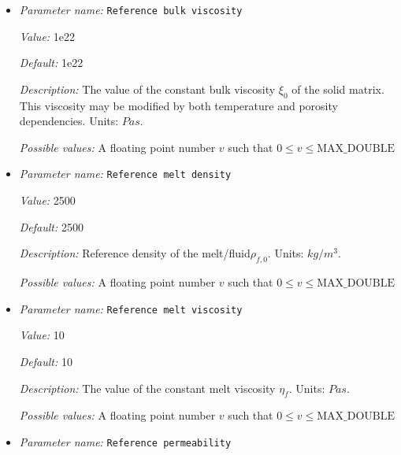 \begin{itemize}
{\it Default:} -300


{\it Description:} The entropy change for the phase transition from solid to melt of peridotite. Units: $J/(kg K)$.


{\it Possible values:} A floating point number $v$ such that $-\text{MAX\_DOUBLE} \leq v \leq \text{MAX\_DOUBLE}$
\item {\it Parameter name:} {\tt Reference bulk viscosity}
\label{parameters:Material model/Melt simple/Reference bulk viscosity}


{\it Value:} 1e22


{\it Default:} 1e22


{\it Description:} The value of the constant bulk viscosity $\xi_0$ of the solid matrix. This viscosity may be modified by both temperature and porosity dependencies. Units: $Pa s$.


{\it Possible values:} A floating point number $v$ such that $0 \leq v \leq \text{MAX\_DOUBLE}$
\item {\it Parameter name:} {\tt Reference melt density}
\label{parameters:Material model/Melt simple/Reference melt density}


{\it Value:} 2500


{\it Default:} 2500


{\it Description:} Reference density of the melt/fluid$\rho_{f,0}$. Units: $kg/m^3$.


{\it Possible values:} A floating point number $v$ such that $0 \leq v \leq \text{MAX\_DOUBLE}$
\item {\it Parameter name:} {\tt Reference melt viscosity}
\label{parameters:Material model/Melt simple/Reference melt viscosity}


{\it Value:} 10


{\it Default:} 10


{\it Description:} The value of the constant melt viscosity $\eta_f$. Units: $Pa s$.


{\it Possible values:} A floating point number $v$ such that $0 \leq v \leq \text{MAX\_DOUBLE}$
\item {\it Parameter name:} {\tt Reference permeability}
\label{parameters:Material model/Melt simple/Reference permeability}



\end{itemize}
